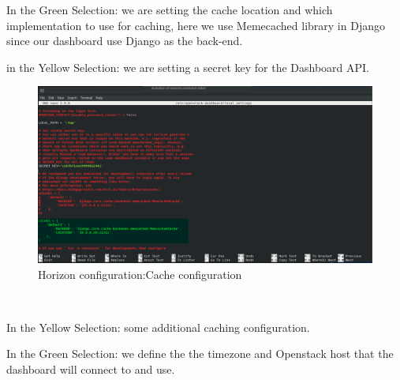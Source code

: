 \begin{spacing}{1.2}
\par In the Green Selection: we are setting the cache location and which implementation to use for caching, here we use Memecached library in Django since our dashboard use Django as the back-end. 
\\
\par in the Yellow Selection: we are setting a secret key for the Dashboard API.
\\
\begin{figure}[!htb] 
\begin{center} 
\includegraphics[width=1\linewidth]{Cloud/Configure Horizon/C_2_conf_2.png} 
\end{center} 
\caption{ Horizon configuration:Cache configuration} 
\end{figure} 
\FloatBarrier
\\
\par In the Yellow Selection: some additional caching configuration.
\par In the Green Selection: we define the the timezone and Openstack host that the dashboard will connect to and use.
\\


\end{spacing}
